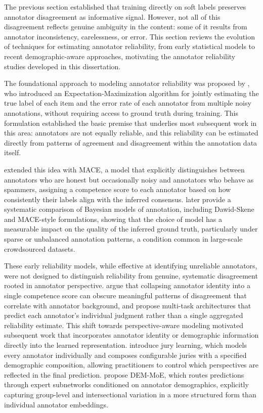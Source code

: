 The previous section established that training directly on soft labels preserves annotator
disagreement as informative signal. However, not all of this disagreement reflects genuine
ambiguity in the content: some of it results from annotator inconsistency, carelessness, or
error. This section reviews the evolution of techniques for estimating annotator reliability,
from early statistical models to recent demographic-aware approaches, motivating the
annotator reliability studies developed in this dissertation.

The foundational approach to modeling annotator reliability was proposed by
\cite{dawid1979maximum}, who introduced an Expectation-Maximization algorithm for
jointly estimating the true label of each item and the error rate of each annotator from
multiple noisy annotations, without requiring access to ground truth during training. This
formulation established the basic premise that underlies most subsequent work in this area:
annotators are not equally reliable, and this reliability can be estimated directly from
patterns of agreement and disagreement within the annotation data itself.

\cite{hovy2013mace} extended this idea with MACE, a model that explicitly distinguishes
between annotators who are honest but occasionally noisy and annotators who behave
as spammers, assigning a competence score to each annotator based on how consistently
their labels align with the inferred consensus. \cite{paun2018comparing} later provide a
systematic comparison of Bayesian models of annotation, including Dawid-Skene and
MACE-style formulations, showing that the choice of model has a measurable impact
on the quality of the inferred ground truth, particularly under sparse or unbalanced
annotation patterns, a condition common in large-scale crowdsourced datasets.

These early reliability models, while effective at identifying unreliable annotators,
were not designed to distinguish reliability from genuine, systematic disagreement rooted
in annotator perspective. \cite{davani2022dealing} argue that collapsing annotator
identity into a single competence score can obscure meaningful patterns of disagreement
that correlate with annotator background, and propose multi-task architectures that
predict each annotator's individual judgment rather than a single aggregated reliability
estimate. This shift towards perspective-aware modeling motivated subsequent work
that incorporates annotator identity or demographic information directly into the
learned representation. \cite{gordon2022jury} introduce jury learning, which models
every annotator individually and composes configurable juries with a specified demographic
composition, allowing practitioners to control which perspectives are reflected in the
final prediction. \cite{xu2025demmoe} propose DEM-MoE, which routes predictions
through expert subnetworks conditioned on annotator demographics, explicitly capturing
group-level and intersectional variation in a more structured form than individual
annotator embeddings.

